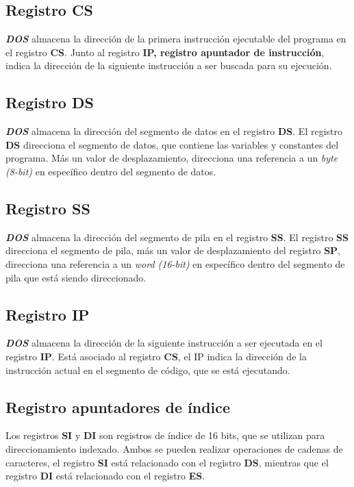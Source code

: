 \documentclass{article}
\begin{document}
\subsection*{Registro CS}
\textit{\textbf{DOS}} almacena la direcci\'{o}n de la primera instrucci\'{o}n ejecutable
del programa en el registro \textbf{CS}. Junto al registro \textbf{IP, registro apuntador
de instrucci\'{o}n}, indica la direcci\'{o}n de la siguiente instrucci\'{o}n a ser buscada
para su ejecuci\'{o}n.

\subsection*{Registro DS}
\textit{\textbf{DOS}} almacena la direcci\'{o}n del segmento de datos en el registro \textbf{DS}.
El registro \textbf{DS} direcciona el segmento de datos, que contiene las variables y constantes
del programa. M\'{a}s un valor de desplazamiento, direcciona una referencia a un
\textit{byte (8-bit)} en espec\'{i}fico dentro del segmento de datos.

\subsection*{Registro SS}
\textit{\textbf{DOS}} almacena la direcci\'{o}n del segmento de pila en el registro \textbf{SS}.
El registro \textbf{SS} direcciona el segmento de pila, m\'{a}s un valor de desplazamiento del
registro \textbf{SP}, direcciona una referencia a un \textit{word (16-bit)} en espec\'{i}fico
dentro del segmento de pila que est\'{a} siendo direccionado.

\subsection*{Registro IP}
\textit{\textbf{DOS}} almacena la direcci\'{o}n de la siguiente instrucci\'{o}n a ser ejecutada
en el registro \textbf{IP}. Est\'{a} asociado al registro \textbf{CS}, el IP indica la direcci\'{o}n
de la instrucci\'{o}n actual en el segmento de c\'{o}digo, que se est\'{a} ejecutando.

\subsection*{Registro apuntadores de \'{i}ndice}
Los registros \textbf{SI} y \textbf{DI} son registros de \'{i}ndice de 16 bits, que se utilizan
para direccionamiento indexado. Ambos se pueden realizar operaciones de cadenas de caracteres,
el registro \textbf{SI}  est\'{a} relacionado con el registro \textbf{DS}, mientras que el
registro \textbf{DI} est\'{a} relacionado con el registro \textbf{ES}.
\end{document}
